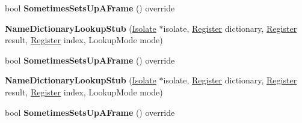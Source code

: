 \begin{DoxyCompactItemize}
\item 
bool {\bfseries Sometimes\+Sets\+Up\+A\+Frame} () override\hypertarget{classv8_1_1internal_1_1_name_dictionary_lookup_stub_acf6465d2597f22c42df4b301e1eaf960}{}\label{classv8_1_1internal_1_1_name_dictionary_lookup_stub_acf6465d2597f22c42df4b301e1eaf960}

\item 
{\bfseries Name\+Dictionary\+Lookup\+Stub} (\hyperlink{classv8_1_1internal_1_1_isolate}{Isolate} $\ast$isolate, \hyperlink{structv8_1_1internal_1_1_register}{Register} dictionary, \hyperlink{structv8_1_1internal_1_1_register}{Register} result, \hyperlink{structv8_1_1internal_1_1_register}{Register} index, Lookup\+Mode mode)\hypertarget{classv8_1_1internal_1_1_name_dictionary_lookup_stub_a90cf312b88926adcb23ba808368760ed}{}\label{classv8_1_1internal_1_1_name_dictionary_lookup_stub_a90cf312b88926adcb23ba808368760ed}

\item 
bool {\bfseries Sometimes\+Sets\+Up\+A\+Frame} () override\hypertarget{classv8_1_1internal_1_1_name_dictionary_lookup_stub_acf6465d2597f22c42df4b301e1eaf960}{}\label{classv8_1_1internal_1_1_name_dictionary_lookup_stub_acf6465d2597f22c42df4b301e1eaf960}

\item 
{\bfseries Name\+Dictionary\+Lookup\+Stub} (\hyperlink{classv8_1_1internal_1_1_isolate}{Isolate} $\ast$isolate, \hyperlink{structv8_1_1internal_1_1_register}{Register} dictionary, \hyperlink{structv8_1_1internal_1_1_register}{Register} result, \hyperlink{structv8_1_1internal_1_1_register}{Register} index, Lookup\+Mode mode)\hypertarget{classv8_1_1internal_1_1_name_dictionary_lookup_stub_a90cf312b88926adcb23ba808368760ed}{}\label{classv8_1_1internal_1_1_name_dictionary_lookup_stub_a90cf312b88926adcb23ba808368760ed}

\item 
bool {\bfseries Sometimes\+Sets\+Up\+A\+Frame} () override\hypertarget{classv8_1_1internal_1_1_name_dictionary_lookup_stub_acf6465d2597f22c42df4b301e1eaf960}{}\label{classv8_1_1internal_1_1_name_dictionary_lookup_stub_acf6465d2597f22c42df4b301e1eaf960}

\end{DoxyCompactItemize}
